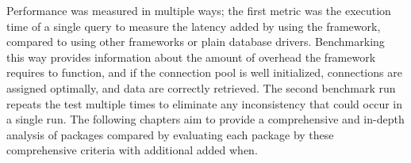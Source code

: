 Performance was measured in multiple ways; the first metric was the execution time of a single query to measure the latency added by using the framework, compared to using other frameworks or plain database drivers. Benchmarking this way provides information about the amount of overhead the framework requires to function, and if the connection pool is well initialized, connections are assigned optimally, and data are correctly retrieved. The second benchmark run repeats the test multiple times to eliminate any inconsistency that could occur in a single run. 
The following chapters aim to provide a comprehensive and in-depth analysis of packages compared by evaluating each package by these comprehensive criteria with additional added when.